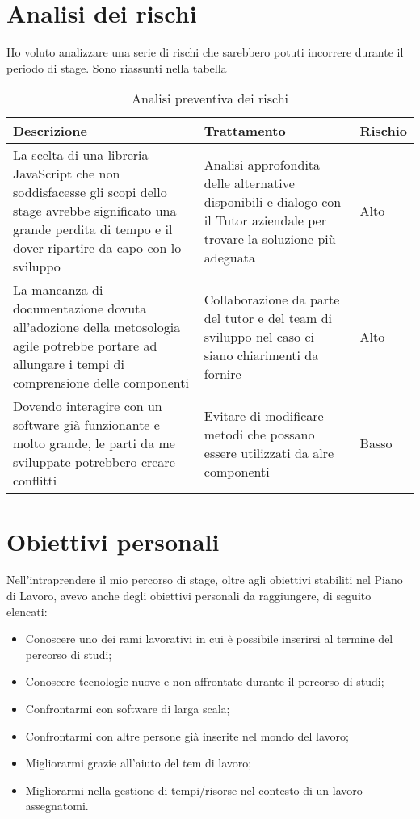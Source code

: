 \section {Analisi dei rischi}
Ho voluto analizzare una serie di rischi che sarebbero potuti incorrere durante il periodo di stage. Sono riassunti nella tabella\\ %

\begin{table} %
\centering
\caption{Analisi preventiva dei rischi}
\label{tab:analisi-dei-rischi}
\begin{tabular}{|p{5cm}|p{5cm}|p{3cm}|}
\hline
Descrizione & Trattamento & Rischio\\
\hline
La scelta di una libreria JavaScript che non soddisfacesse gli scopi dello stage avrebbe significato una grande perdita di tempo e il dover ripartire da capo con lo sviluppo & Analisi approfondita delle alternative disponibili e dialogo con il Tutor aziendale per trovare la soluzione più adeguata & Alto\\
\hline
La mancanza di documentazione dovuta all'adozione della metosologia agile potrebbe portare ad allungare i tempi di comprensione delle componenti & Collaborazione da parte del tutor e del team di sviluppo nel caso ci siano chiarimenti da fornire & Alto\\
\hline
Dovendo interagire con un software già funzionante e molto grande, le parti da me sviluppate potrebbero creare conflitti & Evitare di modificare metodi che possano essere utilizzati da alre componenti & Basso\\
\hline

\end{tabular}
\end{table}

\section {Obiettivi personali}
Nell'intraprendere il mio percorso di stage, oltre agli obiettivi stabiliti nel Piano di Lavoro, avevo anche degli obiettivi personali da raggiungere, di seguito elencati:
\begin{itemize}
\item Conoscere uno dei rami lavorativi in cui è possibile inserirsi al termine del percorso di studi;
\item Conoscere tecnologie nuove e non affrontate durante il percorso di studi;
\item Confrontarmi con software di larga scala;
\item Confrontarmi con altre persone già inserite nel mondo del lavoro;
\item Migliorarmi grazie all'aiuto del tem di lavoro;
\item Migliorarmi nella gestione di tempi/risorse nel contesto di un lavoro assegnatomi.
\end{itemize}